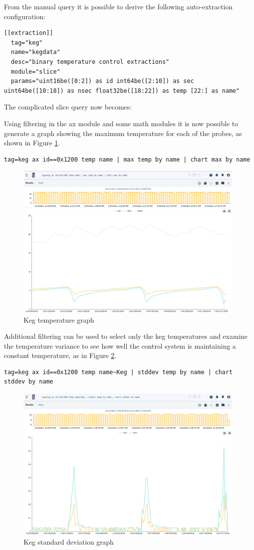 From the manual query it is possible to derive the following
auto-extraction configuration:

\begin{Verbatim}[breaklines=true]
[[extraction]]
  tag="keg"
  name="kegdata"
  desc="binary temperature control extractions"
  module="slice"
  params="uint16be([0:2]) as id int64be([2:10]) as sec 
uint64be([10:18]) as nsec float32be([18:22]) as temp [22:] as name"
\end{Verbatim}

The complicated slice query now becomes:


Using filtering in the ax module and some math modules it is now
possible to generate a graph showing the maximum temperature for each of
the probes, as shown in Figure \ref{fig:keg-temps}.

\begin{Verbatim}[breaklines=true]
tag=keg ax id==0x1200 temp name | max temp by name | chart max by name
\end{Verbatim}

\begin{figure}
	\includegraphics[width=0.65\linewidth]{images/keg-temps.png}
	\caption{Keg temperature graph}
	\label{fig:keg-temps}
\end{figure}

Additional filtering can be used to select only the keg temperatures
and examine the temperature variance to see how well the control system
is maintaining a constant temperature, as in Figure \ref{fig:keg-stddev}.

\begin{Verbatim}[breaklines=true]
tag=keg ax id==0x1200 temp name~Keg | stddev temp by name | chart stddev by name
\end{Verbatim}

\begin{figure}
	\includegraphics[width=0.65\linewidth]{images/keg-stddev.png}
	\caption{Keg standard deviation graph}
	\label{fig:keg-stddev}
\end{figure}

